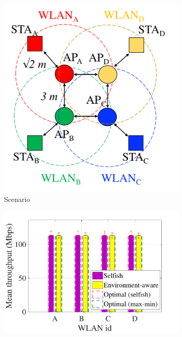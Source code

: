 \documentclass[preprint,12pt]{elsarticle}
\begin{document}
\begin{figure}[h!]
	\centering
	\begin{subfigure}[b]{0.28\textwidth}
		\includegraphics[width=\textwidth]{s5_new}
		\caption{Scenario}
		\label{fig:selfish_s1}
	\end{subfigure}
	\begin{subfigure}[b]{0.4\textwidth}
		\includegraphics[width=\textwidth]{selfish_vs_informed_mean_tpt_sim_2_2}

\end{subfigure}
\end{figure}
\end{document}
